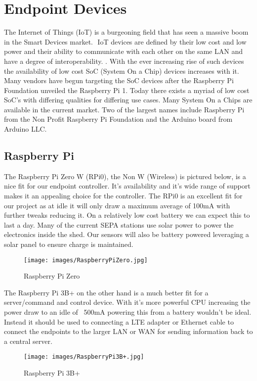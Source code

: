 

\section{Endpoint Devices}

The Internet of Things (IoT) is a burgeoning field that has seen a massive boom in the Smart Devices market. \citep{Lueth2018}⁠ IoT devices are defined by their low cost and low power and their ability to communicate with each other on the same LAN and have a degree of interoperability. \citep{Vujovic2014}⁠. With the ever increasing rise of such devices the availability of low cost SoC (System On a Chip) devices increases with it. Many vendors have begun targeting the SoC devices after the Raspberry Pi Foundation unveiled the Raspberry Pi 1. Today there exists a myriad of low cost SoC’s with differing qualities for differing use cases. \citep{Larabel2018} Many System On a Chips are available in the current market. Two of the largest names include Raspberry Pi from the Non Profit Raspberry Pi Foundation and the Arduino board from Arduino LLC. 

\subsection{Raspberry Pi}
The Raspberry Pi Zero W (RPi0), the Non W (Wireless) is pictured below, is a nice fit for our endpoint controller.  It’s availability and it’s wide range of support makes it an appealing choice for the controller. The RPi0 is an excellent fit for our project as at idle it will only draw a maximum average of 100mA \citep{Alex2017} with further tweaks reducing it. On a relatively low cost battery we can expect this to last a day. Many of the current SEPA stations use solar power to power the electronics inside the shed. \citep{SEPA2007} Our sensors will also be battery powered leveraging a solar panel to ensure charge is maintained.
\begin{figure}[H]
	\centering
	\texttt{[image: images/RaspberryPiZero.jpg]}\\
	\caption{ Raspberry Pi Zero \citep{Amos2016}}
	\label{fig:pizero}
\end{figure}
The Raspberry Pi 3B+ on the other hand is a much better fit for a server/command and control device. \citep{Leccese2014} With it's more powerful CPU increasing the power draw to an idle of ~500mA \citep{RaspberryPiFoundation2018} powering this from a battery wouldn't be ideal. Instead it should be used to connecting a LTE adapter or Ethernet cable to connect the endpoints to the larger LAN or WAN for sending information back to a central server.
\begin{figure}[H]
	\centering
	\texttt{[image: images/RaspberryPi3B+.jpg]}
	\caption{ Raspberry Pi 3B+ \citep{RaspberryPiFoundation2018a}}
	\label{fig:pi3b}
\end{figure}
